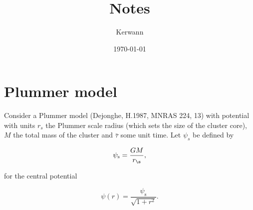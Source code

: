 \documentclass[11pt]{article}
\author{Kerwann}
\date{\today}
\title{Notes}
\newcommand{\rs}{\mathrm{s}}
\newcommand{\psis}{\psi_{\rs}}
\begin{document}
\maketitle

\section{Plummer model}
\label{sec:org6bde748}

  Consider a Plummer model (Dejonghe, H.1987, MNRAS 224, 13) with potential
with units \(r_{s}\) the Plummer scale radius (which sets the size
of the cluster core), \(M\) the total mass of the cluster and \(\bar{\tau}\)
some unit time. Let \(\psi_{s}\) be defined by

\begin{equation}
\psis=\frac{G M}{r_{\s}} ,
\label{def_psi_s}
\end{equation}

for the central potential

\begin{equation}
\psi(r)=\frac{\psis}{\sqrt{1+r^{2}}} .
\label{def_potential}
\end{equation}
\end{document}
